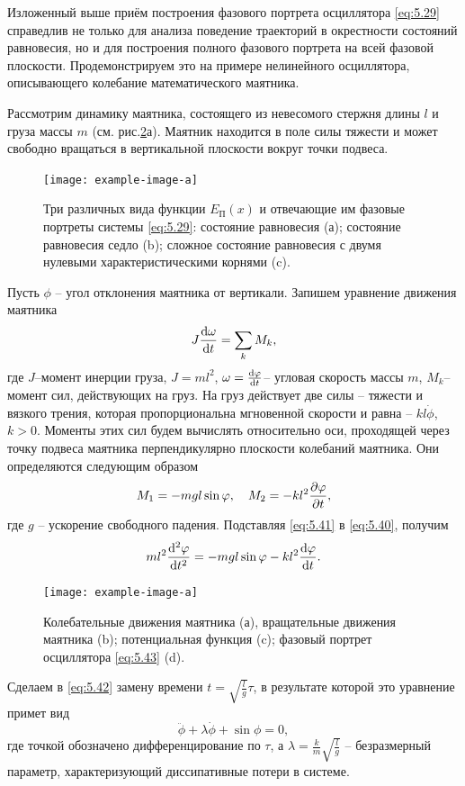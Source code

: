  Изложенный выше приём построения фазового портрета осциллятора \eqref{eq:5.29} справедлив не только для анализа поведение траекторий в окрестности состояний равновесия, но и для построения полного фазового портрета на всей фазовой плоскости. Продемонстрируем это на примере нелинейного осциллятора, описывающего колебание математического маятника.

 Рассмотрим динамику маятника, состоящего из невесомого стержня длины $l$ и груза массы $m$ (см. рис.\ref{fig:5.8}а). Маятник находится в поле силы тяжести и может свободно вращаться в вертикальной плоскости вокруг точки подвеса.

 \begin{figure}[h]
         \centering
         \texttt{[image: example-image-a]}
         \caption{Три различных вида функции $E_{\text{П}}(x)$ и отвечающие им фазовые портреты системы \eqref{eq:5.29}: состояние равновесия (а); состояние равновесия седло (b); сложное состояние равновесия с двумя нулевыми характеристическими корнями (c).}
         \label{fig:5.7}
 \end{figure}

 Пусть $\phi$ -- угол отклонения маятника от вертикали. Запишем уравнение движения маятника
 \begin{equation}
         \label{eq:5.40}
         J \dv{\omega}{t} = \sum\limits_{k} M_k,
 \end{equation}
 где $J$--момент инерции груза, $J= ml^2$, $\omega = \dv{\varphi}{t}$-- угловая скорость массы $m$, $M_k$-- момент сил, действующих на груз. На груз действует две силы -- тяжести и вязкого трения, которая пропорциональна мгновенной скорости и равна -- $k l \dot \phi$, $k>0$. Моменты этих сил будем вычислять относительно оси, проходящей через точку подвеса маятника перпендикулярно плоскости колебаний маятника. Они определяются следующим образом
 \begin{equation}
         \label{eq:5.41}
         M_1 = - mgl \sin \varphi, \quad M_2 = - kl^2 \pdv{\varphi}{t},
 \end{equation}
 где $g$ -- ускорение свободного падения. Подставляя \eqref{eq:5.41} в \eqref{eq:5.40}, получим
 \begin{equation}
         \label{eq:5.42}
         ml^2 \dv[2]{\varphi}{t} = - mgl\sin \varphi - kl^2 \dv{\varphi}{t}.
 \end{equation}
 \begin{figure}[h]
         \centering
         \texttt{[image: example-image-a]}
         \caption{Колебательные движения маятника (а), вращательные движения маятника (b); 
         потенциальная функция (c); фазовый портрет осциллятора \eqref{eq:5.43} (d).}
         \label{fig:5.8}
 \end{figure}
 Сделаем в \eqref{eq:5.42} замену времени $t = \sqrt{ \frac{l}{g}} \tau$, в результате которой это уравнение примет вид
 \begin{equation}
         \label{eq:5.43}
         \ddot \phi + \lambda \dot \phi + \sin \phi =0,
 \end{equation}
 где точкой обозначено дифференцирование по $\tau$, а $\lambda = \frac{k}{m} \sqrt{ \frac{l}{g}}$
-- безразмерный параметр, характеризующий диссипативные потери в системе.

